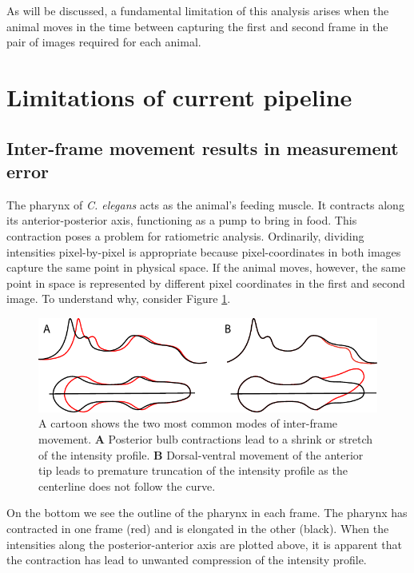 As will be discussed, a fundamental limitation of this analysis arises when the animal moves in the time between capturing the first and second frame in the pair of images required for each animal. 

\section{Limitations of current pipeline} \label{limitations}
\subsection{Inter-frame movement results in measurement error} \label{limitationMovement}

The pharynx of \textit{C. elegans} acts as the animal's feeding muscle. It contracts along its anterior-posterior axis, functioning as a pump to bring in food. This contraction poses a problem for ratiometric analysis. Ordinarily, dividing intensities pixel-by-pixel is appropriate because pixel-coordinates in both images capture the same point in physical space. If the animal moves, however, the same point in space is represented by different pixel coordinates in the first and second image. To understand  why, consider Figure \ref{fig:MovementCartoon}.


\begin{figure}[ht]
    \centering
    \includegraphics{Figures/rendered_files/movement_cartoon}
    \decoRule
    \caption[Pharyngeal contractions lead to boundary issues]{A cartoon shows the two most common modes of inter-frame movement. \textbf{A} Posterior bulb contractions lead to a shrink or stretch of the intensity profile. \textbf{B} Dorsal-ventral movement of the anterior tip leads to premature truncation of the intensity profile as the centerline does not follow the curve.}
    \label{fig:MovementCartoon}
\end{figure}

On the bottom we see the outline of the pharynx in each frame. The pharynx has contracted in one frame (red) and is elongated in the other (black). When the intensities along the posterior-anterior axis are plotted above, it is apparent that the contraction has lead to unwanted compression of the intensity profile.

